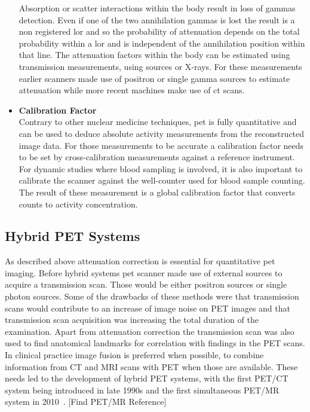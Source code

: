 \begin{itemize}
Absorption or scatter interactions within the body result in loss of gammas detection. Even if one of the two annihilation gammas is lost the result is a non registered \gls{lor} and so the probability of attenuation depends on the total probability within a \gls{lor} and is independent of the annihilation position within that line. The attenuation factors within the body can be estimated using transmission measurements, using sources or X-rays.  For these measurements earlier scanners made use of positron or single gamma sources to estimate attenuation while more recent machines make use of \gls{ct} scans. 
\item\textbf{Calibration Factor}\\
Contrary to other nuclear medicine techniques, \gls{pet} is fully quantitative and can be used to deduce absolute activity measurements from the reconstructed image data. For those measurements to be accurate a calibration factor needs to be set by cross-calibration measurements against a reference instrument. For dynamic studies where blood sampling is involved, it is also important to calibrate the scanner against the well-counter used for blood sample counting. The result of these measurement is a global calibration factor that converts counts to activity concentration. 
\end{itemize}


\subsection{Hybrid PET Systems}
As described above attenuation correction is essential for quantitative \gls{pet} imaging. Before hybrid systems \gls{pet} scanner made use of external sources to acquire a transmission scan. Those would be either positron sources or single photon sources. Some of the drawbacks of these methods were that transmission scans would contribute to an increase of image noise on PET images and that transmission scan acquisition was increasing the total duration of the examination. 
Apart from attenuation correction the transmission scan was also used to find anatomical landmarks for correlation with findings in the PET scans. In clinical practice image fusion is preferred when possible, to combine information from CT and MRI scans with PET when those are available. 
These needs led to the development of hybrid PET systems, with the first PET/CT system being introduced in late 1990s and the first simultaneous PET/MR system in 2010~\cite{Townsend2008,}. [Find PET/MR Reference]

